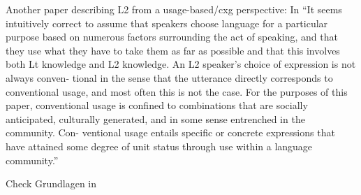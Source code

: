 Another paper describing L2 from a usage-based/cxg perspective:
In \cite{}
``It seems intuitively correct to assume
that speakers choose language for a particular purpose based on numerous
factors surrounding the act of speaking, and that they use what they have to
take them as far as possible and that this involves both Lt knowledge and
L2 knowledge. An L2 speaker's choice of expression is not always conven-
tional in the sense that the utterance directly corresponds to conventional
usage, and most often this is not the case. For the purposes of this paper,
conventional usage is confined to combinations that are socially anticipated,
culturally generated, and in some sense entrenched in the community. Con-
ventional usage entails specific or concrete expressions that have attained
some degree of unit status through use within a language community.''

Check Grundlagen in \cite{Ziem13}
